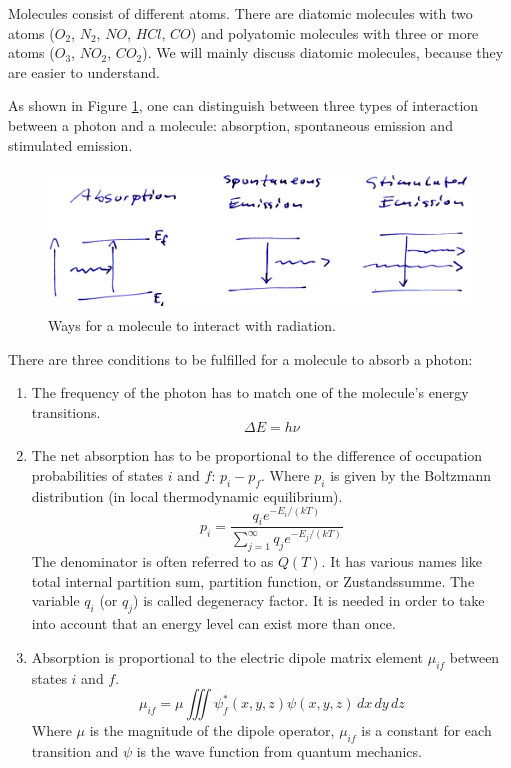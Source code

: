 Molecules consist of different atoms. There are diatomic molecules with two
atoms ($O_2$, $N_2$, $NO$, $HCl$, $CO$) and polyatomic molecules with
three or more atoms ($O_3$, $NO_2$, $CO_2$). We will mainly discuss
diatomic molecules, because they are easier to understand.

As shown in Figure \ref{fig:interaction_types}, one can distinguish
between three types of interaction between a photon and a molecule:
absorption, spontaneous emission and stimulated emission.

\begin{figure}
  \centering
  \includegraphics[width=\hsize]{figures/interaction_types}
  \caption{Ways for a molecule to interact with radiation.}
  \label{fig:interaction_types}
\end{figure}

There are three conditions to be fulfilled for a molecule to absorb a
photon:
\begin{enumerate}
\item The frequency of the photon has to match one of the molecule's energy
transitions.
\begin{equation}
  \Delta E = h \nu
\end{equation}

\item The net absorption has to be proportional to the difference of occupation
probabilities of states $i$ and $f$: $p_i - p_f$. Where $p_i$ is given by the
Boltzmann distribution (in local thermodynamic equilibrium).
\begin{equation}
  p_i = \frac{q_i e^{-E_i / (kT)}}
        {\sum_{j=1}^\infty q_j e^{-E_j / (kT)}}
\end{equation}
The denominator is often referred to as $Q(T)$. It has various names like total
internal partition sum, partition function, or Zustandssumme. The variable $q_i$
(or $q_j$) is called degeneracy factor. It is needed in order to take into account
that an energy level can exist more than once.

\item Absorption is proportional to the electric dipole matrix element $\mu_{if}$
between states $i$ and $f$.
\begin{equation}
  \mu_{if} = \mu \iiint \psi_f^*(x,y,z) \psi(x,y,z) \,dx\,dy\,dz
\end{equation}
Where $\mu$ is the magnitude of the dipole operator, $\mu_{if}$ is a constant
for each transition and $\psi$ is the wave function from quantum mechanics.
\end{enumerate}

